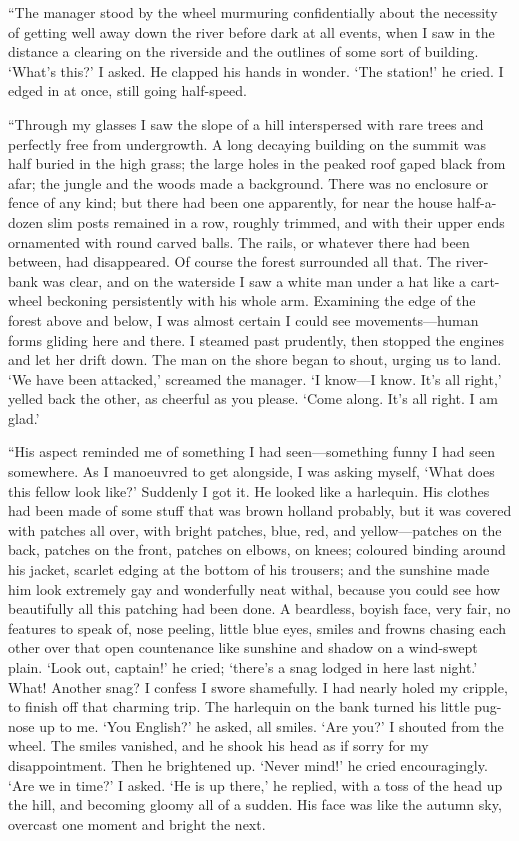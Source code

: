 \documentclass[12pt]{report}
\begin{document}
``The manager stood by the wheel murmuring confidentially about the
necessity of getting well away down the river before dark at all events,
when I saw in the distance a clearing on the riverside and the outlines
of some sort of building. `What's this?' I asked. He clapped his hands
in wonder. `The station!' he cried. I edged in at once, still going
half-speed.

``Through my glasses I saw the slope of a hill interspersed with rare
trees and perfectly free from undergrowth. A long decaying building on
the summit was half buried in the high grass; the large holes in the
peaked roof gaped black from afar; the jungle and the woods made a
background. There was no enclosure or fence of any kind; but there had
been one apparently, for near the house half-a-dozen slim posts remained
in a row, roughly trimmed, and with their upper ends ornamented with
round carved balls. The rails, or whatever there had been between, had
disappeared. Of course the forest surrounded all that. The river-bank
was clear, and on the waterside I saw a white man under a hat like a
cart-wheel beckoning persistently with his whole arm. Examining the edge
of the forest above and below, I was almost certain I could see
movements---human forms gliding here and there. I steamed past
prudently, then stopped the engines and let her drift down. The man on
the shore began to shout, urging us to land. `We have been attacked,'
screamed the manager. `I know---I know. It's all right,' yelled back the
other, as cheerful as you please. `Come along. It's all right. I am
glad.'

``His aspect reminded me of something I had seen---something funny I had
seen somewhere. As I manoeuvred to get alongside, I was asking myself,
`What does this fellow look like?' Suddenly I got it. He looked like a
harlequin. His clothes had been made of some stuff that was brown
holland probably, but it was covered with patches all over, with bright
patches, blue, red, and yellow---patches on the back, patches on the
front, patches on elbows, on knees; coloured binding around his jacket,
scarlet edging at the bottom of his trousers; and the sunshine made him
look extremely gay and wonderfully neat withal, because you could see
how beautifully all this patching had been done. A beardless, boyish
face, very fair, no features to speak of, nose peeling, little blue
eyes, smiles and frowns chasing each other over that open countenance
like sunshine and shadow on a wind-swept plain. `Look out, captain!' he
cried; `there's a snag lodged in here last night.' What! Another snag? I
confess I swore shamefully. I had nearly holed my cripple, to finish off
that charming trip. The harlequin on the bank turned his little pug-nose
up to me. `You English?' he asked, all smiles. `Are you?' I shouted from
the wheel. The smiles vanished, and he shook his head as if sorry for my
disappointment. Then he brightened up. `Never mind!' he cried
encouragingly. `Are we in time?' I asked. `He is up there,' he replied,
with a toss of the head up the hill, and becoming gloomy all of a
sudden. His face was like the autumn sky, overcast one moment and bright
the next.
\end{document}

